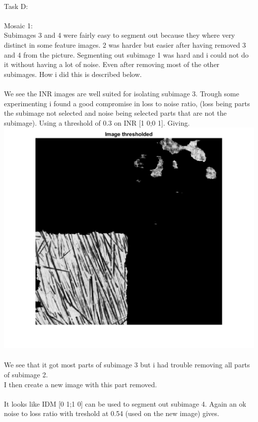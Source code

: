 \documentclass[12pt, letterpaper, twoside]{article}
\begin{document}
\newpage
\ \\
Task D:\\
\ \\
Mosaic 1:\\
Subimages 3 and 4 were fairly easy to segment out because they where very distinct in some feature images. 2 was harder but easier after having removed 3 and 4 from the picture. Segmenting out subimage 1 was hard and i could not do it without having a lot of noise. Even after removing most of the other subimages. How i did this is described below.\\ 
\ \\
We see the INR images are well suited for isolating subimage 3. Trough some experimenting i found a good compromise in loss to noise ratio, (loss being parts the subimage not selected and noise being selected parts that are not the subimage). Using a threshold of 0.3 on INR [1 0;0 1]. Giving.\\
\includegraphics[scale=0.6]{"1sub3seg.png"}\\
\ \\
We see that it got most parts of subimage 3 but i had trouble removing all parts of subimage 2.\\
I then create a new image with this part removed.\\
\ \\
It looks like IDM [0 1;1 0] can be used to segment out subimage 4. Again an ok noise to loss ratio with treshold at 0.54 (used on the new image) gives.\\
\end{document}
